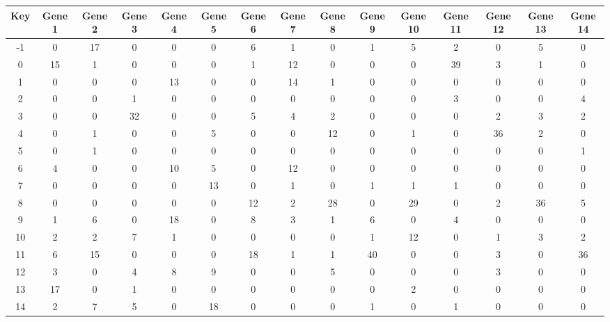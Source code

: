 \begin{tabular}{|c|c|c|c|c|c|c|c|c|c|c|c|c|c|c|}
\hline
Key & Gene 1 & Gene 2 & Gene 3 & Gene 4 & Gene 5 & Gene 6 & Gene 7 & Gene 8 & Gene 9 & Gene 10 & Gene 11 & Gene 12 & Gene 13 & Gene 14 \\
\hline
-1 & 0 & 17 & 0 & 0 & 0 & 6 & 1 & 0 & 1 & 5 & 2 & 0 & 5 & 0 \\
0 & 15 & 1 & 0 & 0 & 0 & 1 & 12 & 0 & 0 & 0 & 39 & 3 & 1 & 0 \\
1 & 0 & 0 & 0 & 13 & 0 & 0 & 14 & 1 & 0 & 0 & 0 & 0 & 0 & 0 \\
2 & 0 & 0 & 1 & 0 & 0 & 0 & 0 & 0 & 0 & 0 & 3 & 0 & 0 & 4 \\
3 & 0 & 0 & 32 & 0 & 0 & 5 & 4 & 2 & 0 & 0 & 0 & 2 & 3 & 2 \\
4 & 0 & 1 & 0 & 0 & 5 & 0 & 0 & 12 & 0 & 1 & 0 & 36 & 2 & 0 \\
5 & 0 & 1 & 0 & 0 & 0 & 0 & 0 & 0 & 0 & 0 & 0 & 0 & 0 & 1 \\
6 & 4 & 0 & 0 & 10 & 5 & 0 & 12 & 0 & 0 & 0 & 0 & 0 & 0 & 0 \\
7 & 0 & 0 & 0 & 0 & 13 & 0 & 1 & 0 & 1 & 1 & 1 & 0 & 0 & 0 \\
8 & 0 & 0 & 0 & 0 & 0 & 12 & 2 & 28 & 0 & 29 & 0 & 2 & 36 & 5 \\
9 & 1 & 6 & 0 & 18 & 0 & 8 & 3 & 1 & 6 & 0 & 4 & 0 & 0 & 0 \\
10 & 2 & 2 & 7 & 1 & 0 & 0 & 0 & 0 & 1 & 12 & 0 & 1 & 3 & 2 \\
11 & 6 & 15 & 0 & 0 & 0 & 18 & 1 & 1 & 40 & 0 & 0 & 3 & 0 & 36 \\
12 & 3 & 0 & 4 & 8 & 9 & 0 & 0 & 5 & 0 & 0 & 0 & 3 & 0 & 0 \\
13 & 17 & 0 & 1 & 0 & 0 & 0 & 0 & 0 & 0 & 2 & 0 & 0 & 0 & 0 \\
14 & 2 & 7 & 5 & 0 & 18 & 0 & 0 & 0 & 1 & 0 & 1 & 0 & 0 & 0 \\
\hline
\end{tabular}